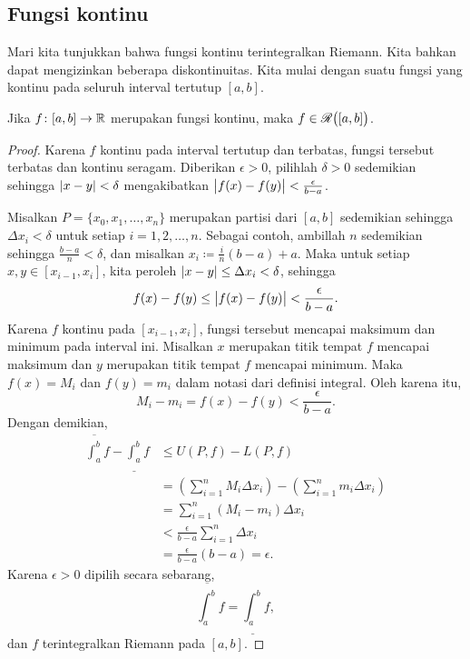 \subsection{Fungsi kontinu}

Mari kita tunjukkan bahwa fungsi kontinu terintegralkan Riemann.
Kita bahkan dapat mengizinkan beberapa diskontinuitas.  Kita mulai dengan suatu
fungsi yang kontinu pada seluruh interval tertutup $[a,b]$.

\begin{lemma} \label{lemma:contint}
Jika $f \colon [a,b] \to {\mathbb{R}}$ merupakan fungsi kontinu,
maka $f \in {\mathscr{R}}\bigl([a,b]\bigr)$.
\end{lemma}

\begin{proof}
Karena $f$ kontinu pada interval tertutup dan terbatas, fungsi tersebut
terbatas dan
kontinu seragam.
Diberikan $\epsilon > 0$, pilihlah $\delta > 0$ sedemikian sehingga
$\lvert {x-y} \rvert < \delta$ mengakibatkan $\bigl\lvert {f(x)-f(y)} \bigr\rvert < \frac{\epsilon}{b-a}$.

Misalkan $P = \{ x_0, x_1, \ldots, x_n \}$
merupakan partisi dari $[a,b]$ sedemikian sehingga $\Delta x_i < \delta$ untuk setiap $i = 1,2,
\ldots, n$.  Sebagai contoh,
ambillah $n$ sedemikian sehingga $\frac{b-a}{n} < \delta$, dan
misalkan $x_i \coloneqq \frac{i}{n}(b-a) + a$.
Maka untuk setiap $x, y \in [x_{i-1},x_i]$, kita peroleh 
$\lvert {x-y} \rvert \leq \Delta x_i < \delta$, sehingga
\begin{equation*}
f(x)-f(y) \leq \bigl\lvert {f(x)-f(y)} \bigr\rvert < \frac{\epsilon}{b-a} .
\end{equation*}
Karena $f$ kontinu pada $[x_{i-1},x_i]$, fungsi tersebut mencapai maksimum dan minimum
pada interval ini.
Misalkan $x$ merupakan titik tempat $f$ mencapai maksimum dan $y$ merupakan titik
tempat $f$ mencapai minimum.  Maka $f(x) = M_i$
dan $f(y) = m_i$ dalam notasi dari definisi integral.
Oleh karena itu,
\begin{equation*}
M_i-m_i = f(x)-f(y) < 
\frac{\epsilon}{b-a} .
\end{equation*}
Dengan demikian,
\begin{equation*}
\begin{split}
\overline{\int_a^b} f - 
\underline{\int_a^b} f 
& \leq
U(P,f) - L(P,f)
\\
& =
\left(
\sum_{i=1}^n
M_i \Delta x_i
\right)
-
\left(
\sum_{i=1}^n
m_i \Delta x_i
\right)
\\
& =
\sum_{i=1}^n
(M_i-m_i) \Delta x_i
\\
& <
\frac{\epsilon}{b-a}
\sum_{i=1}^n
\Delta x_i
\\
& =
\frac{\epsilon}{b-a} (b-a)
= \epsilon .
\end{split}
\end{equation*}
Karena $\epsilon > 0$ dipilih secara sebarang,
\begin{equation*}
\overline{\int_a^b} f = \underline{\int_a^b} f ,
\end{equation*}
dan $f$ terintegralkan Riemann pada $[a,b]$.
\end{proof}


